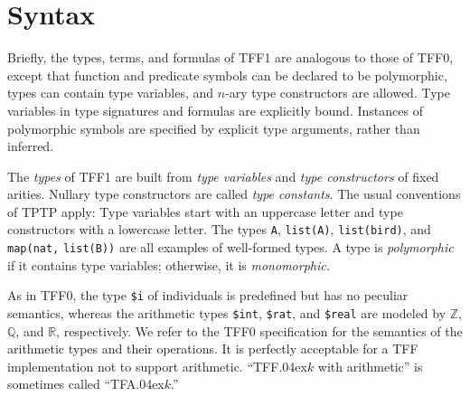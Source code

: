 
\section{Syntax} \label{sec_syntax}

Briefly, the types, terms, and formulas of TFF1 are analogous to those of TFF0,
except that function and predicate symbols can be declared to be polymorphic,
types can contain type variables, and $n$-ary type constructors are allowed.
Type variables in type signatures and formulas are explicitly bound. Instances of
polymorphic symbols are specified by explicit type arguments, rather than
inferred.

 The {\em types\/} of TFF1 are built from {\em type
variables\/} and {\em type constructors\/} of fixed arities. Nullary type
constructors are called {\em type constants}. The usual conventions of TPTP
apply: Type variables start with an uppercase letter and type constructors
with a lowercase letter. The types \verb+A+, \verb+list(A)+, \verb+list(bird)+,
and \verb+map(nat,+ \verb+list(B))+ are all examples of well-formed types. A
type is {\em polymorphic} if it contains type variables; otherwise, it is {\em
monomorphic.}


As in TFF0, the type {\tt \$i} %
of individuals is predefined but has no peculiar semantics, whereas the
arithmetic types
{\tt \$int}, {\tt \$rat}, and {\tt \$real} are modeled by $\mathbb{Z}$,
$\mathbb{Q}$, and $\mathbb{R}$, respectively. We refer
to the TFF0 specification \cite{sutcliffe-et-al-2011-tff0} for the semantics of
the arithmetic types and their operations. It is perfectly acceptable for a TFF
implementation not to support arithmetic. ``TFF\kern.04ex$k$ with arithmetic'' is
sometimes called ``TFA\kern.04ex$k$.''

